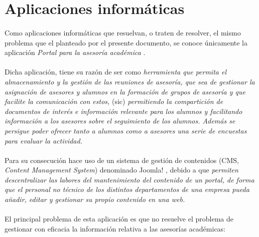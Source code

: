 \section{Aplicaciones informáticas}

\paragraph{}Como aplicaciones informáticas que resuelvan, o traten de resolver,
el mismo problema que el planteado por el presente documento, se conoce
únicamente la aplicación \textit{Portal para la asesoría académica}
\cite{carmonaVaro}.

\paragraph{}Dicha aplicación, tiene su razón de ser como \textit{herramienta que
permita el almacenamiento y la gestión de las reuniones de asesoría, que sea de
gestionar la asignación de asesores y alumnos en la formación de grupos de
asesoría y que facilite la comunicación con estos,} (sic) \textit{permitiendo la
compartición de documentos de interés e información relevante para los alumnos y
facilitando información a los asesores sobre el seguimiento de los alumnos.
Además se persigue poder ofrecer tanto a alumnos como a asesores una serie de
encuestas para evaluar la actividad.}

\paragraph{}Para su consecución hace uso de un sistema de gestión de contenidos
(CMS, \textit{Content Management System}) denominado Joomla! \cite{joomla},
debido a que \textit{permiten descentralizar las labores del mantenimiento del
contenido de un portal, de forma que el personal no técnico de los distintos
departamentos de una empresa pueda añadir, editar y gestionar su propio
contenido en una web.}

\paragraph{}El principal problema de esta aplicación es que no resuelve el
problema de gestionar con eficacia la información relativa a las asesorías
académicas:

